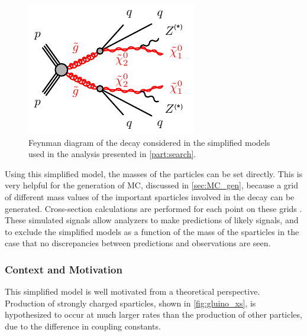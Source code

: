 \begin{centering}
\begin{figure}[!hbt]
\myfloatalign
\includegraphics[width=.9\linewidth]{figures/theory/gogo-qqqqZZN1N1.pdf}
\caption{Feynman diagram of the decay considered in the simplified models used in the analysis presented in \autoref{part:search}.}
\label{fig:simpmodel}
\end{figure}
\end{centering}

Using this simplified model, the masses of the particles can be set directly. This is very helpful for the generation of \acf{MC}, discussed in \autoref{sec:MC_gen}, because a grid of different mass values of the important sparticles involved in the decay can be generated. Cross-section calculations are performed for each point on these grids \cite{1105.1110}. These simulated signals allow analyzers to make predictions of likely signals, and to exclude the simplified models as a function of the mass of the sparticles in the case that no discrepancies between predictions and observations are seen. 


\subsubsection{Context and Motivation}

This simplified model is well motivated from a theoretical perspective. Production of strongly charged sparticles, shown in \autoref{fig:gluino_xs}, is hypothesized to occur at much larger rates than the production of other particles, due to the difference in coupling constants. 

